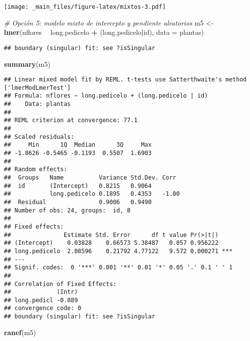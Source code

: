 \documentclass[
]{book}
\newenvironment{Shaded}{\begin{snugshade}}{\end{snugshade}}
\newcommand{\CommentTok}[1]{\textcolor[rgb]{0.56,0.35,0.01}{\textit{#1}}}
\newcommand{\DataTypeTok}[1]{\textcolor[rgb]{0.13,0.29,0.53}{#1}}
\newcommand{\KeywordTok}[1]{\textcolor[rgb]{0.13,0.29,0.53}{\textbf{#1}}}
\newcommand{\NormalTok}[1]{#1}
\newcommand{\OperatorTok}[1]{\textcolor[rgb]{0.81,0.36,0.00}{\textbf{#1}}}
\newcommand{\StringTok}[1]{\textcolor[rgb]{0.31,0.60,0.02}{#1}}
\begin{document}
\texttt{[image: \_main\_files/figure-latex/mixtos-3.pdf]}

\begin{Shaded}
\begin{Highlighting}[]
\CommentTok{# Opción 5: modelo mixto de intercepto y pendiente aleatorios}
\NormalTok{m5 <-}\StringTok{ }\KeywordTok{lmer}\NormalTok{(nflores }\OperatorTok{~}\StringTok{ }\NormalTok{long.pedicelo }\OperatorTok{+}\StringTok{ }\NormalTok{(long.pedicelo}\OperatorTok{|}\NormalTok{id), }\DataTypeTok{data =}\NormalTok{ plantas)}
\end{Highlighting}
\end{Shaded}

\begin{verbatim}
## boundary (singular) fit: see ?isSingular
\end{verbatim}

\begin{Shaded}
\begin{Highlighting}[]
\KeywordTok{summary}\NormalTok{(m5)}
\end{Highlighting}
\end{Shaded}

\begin{verbatim}
## Linear mixed model fit by REML. t-tests use Satterthwaite's method ['lmerModLmerTest']
## Formula: nflores ~ long.pedicelo + (long.pedicelo | id)
##    Data: plantas
## 
## REML criterion at convergence: 77.1
## 
## Scaled residuals: 
##     Min      1Q  Median      3Q     Max 
## -1.8626 -0.5465 -0.1193  0.5507  1.6903 
## 
## Random effects:
##  Groups   Name          Variance Std.Dev. Corr 
##  id       (Intercept)   0.8215   0.9064        
##           long.pedicelo 0.1895   0.4353   -1.00
##  Residual               0.9006   0.9490        
## Number of obs: 24, groups:  id, 8
## 
## Fixed effects:
##               Estimate Std. Error      df t value Pr(>|t|)    
## (Intercept)    0.03828    0.66573 5.38487   0.057 0.956222    
## long.pedicelo  2.08596    0.21792 4.77122   9.572 0.000271 ***
## ---
## Signif. codes:  0 '***' 0.001 '**' 0.01 '*' 0.05 '.' 0.1 ' ' 1
## 
## Correlation of Fixed Effects:
##             (Intr)
## long.pedicl -0.889
## convergence code: 0
## boundary (singular) fit: see ?isSingular
\end{verbatim}

\begin{Shaded}
\begin{Highlighting}[]
\KeywordTok{ranef}\NormalTok{(m5)}
\end{Highlighting}
\end{Shaded}
\end{document}
